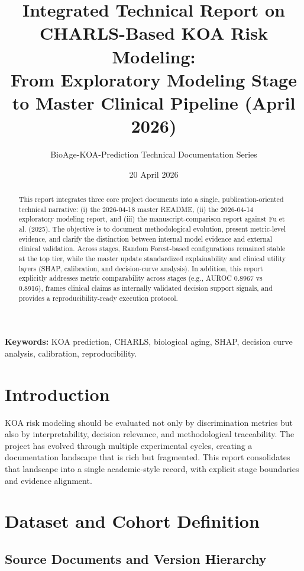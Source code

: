 ﻿\documentclass[11pt,a4paper]{article}
\title{Integrated Technical Report on CHARLS-Based KOA Risk Modeling:\\
\large From Exploratory Modeling Stage to Master Clinical Pipeline (April 2026)}
\author{BioAge-KOA-Prediction Technical Documentation Series}
\date{20 April 2026}
\begin{document}
\maketitle
\begin{abstract}
This report integrates three core project documents into a single, publication-oriented
technical narrative: (i) the 2026-04-18 master README, (ii) the 2026-04-14 exploratory
modeling report, and (iii) the manuscript-comparison report against Fu et al. (2025).
The objective is to document methodological evolution, present metric-level evidence,
and clarify the distinction between internal model evidence and external clinical validation.
Across stages, Random Forest-based configurations remained stable at the top tier,
while the master update standardized explainability and clinical utility layers
(SHAP, calibration, and decision-curve analysis). In addition, this report explicitly
addresses metric comparability across stages (e.g., AUROC 0.8967 vs 0.8916),
frames clinical claims as internally validated decision support signals, and provides a
reproducibility-ready execution protocol.
\end{abstract}

\textbf{Keywords:} KOA prediction, CHARLS, biological aging, SHAP,
decision curve analysis, calibration, reproducibility.

\tableofcontents
\newpage

\section{Introduction}

KOA risk modeling should be evaluated not only by discrimination metrics but also by
interpretability, decision relevance, and methodological traceability. The project has
evolved through multiple experimental cycles, creating a documentation landscape that is
rich but fragmented. This report consolidates that landscape into a single academic-style
record, with explicit stage boundaries and evidence alignment.

\section{Dataset and Cohort Definition}

\subsection{Source Documents and Version Hierarchy}
\end{document}
